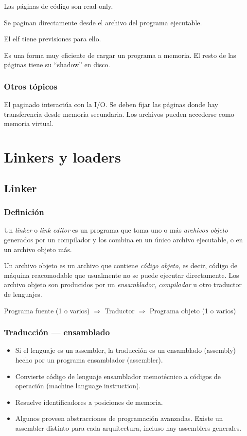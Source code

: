 \documentclass[a4paper, twoside]{article}
\begin{document}
Las páginas de código son read-only.

Se paginan directamente desde el archivo del programa ejecutable.

El elf tiene previsiones para ello.

Es una forma muy eficiente de cargar un programa a memoria.
El resto de las páginas tiene su ``shadow'' en disco.

\subsubsection{Otros tópicos}

El paginado interactúa con la I/O.
Se deben fijar las páginas donde hay transferencia desde memoria secundaria.
Los archivos pueden accederse como memoria virtual.

\newpage
\section{Linkers y loaders}

\subsection{Linker}

\subsubsection{Definición}

Un \emph{linker} o \emph{link editor} es un programa que toma uno o más
\emph{archivos objeto} generados por un compilador y los combina en un único
archivo ejecutable, o en un archivo objeto más.

Un archivo objeto es un archivo que contiene \emph{código objeto}, es decir,
código de máquina reacomodable que usualmente no se puede ejecutar directamente.
Los archivo objeto son producidos por un \emph{ensamblador}, \emph{compilador}
u otro traductor de lenguajes.

\begin{center}
  Programa fuente (1 o varios) $\Rightarrow$ Traductor $\Rightarrow$
  Programa objeto (1 o varios)
\end{center}

\subsubsection{Traducción --- ensamblado}

\begin{itemize}
  \item Si el lenguaje es un assembler, la traducción es un ensamblado
  (assembly) hecho por un programa ensamblador (assembler).
  \item Convierte código de lenguaje ensamblador memotécnico a códigos
  de operación (machine language instruction).
  \item Resuelve identificadores a posiciones de memoria.
  \item Algunos proveen abstracciones de programación avanzadas.
  Existe un assembler distinto para cada arquitectura, incluso hay assemblers
  generales.
\end{itemize}
\end{document}
